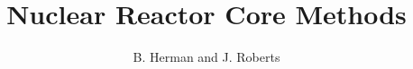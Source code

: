 \documentclass[graybox,envcountchap,sectrefs]{svmono}
\begin{document}
\author{B. Herman and J. Roberts}
\title{Nuclear Reactor Core Methods}
\maketitle

\frontmatter%






\tableofcontents




\mainmatter%

























\backmatter%

% 
\printindex

\end{document}
